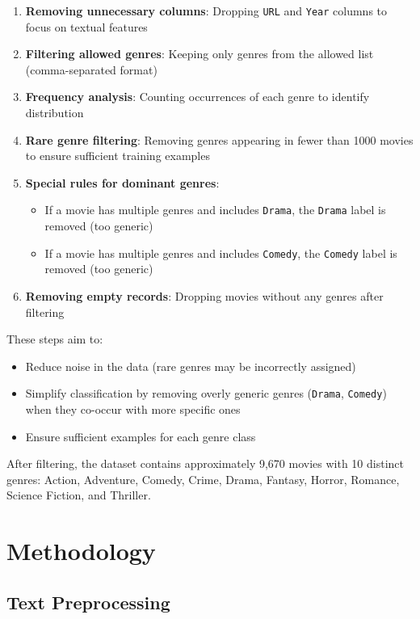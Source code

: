 \documentclass[12pt,a4paper]{article}
\begin{document}
\begin{enumerate}
    \item \textbf{Removing unnecessary columns}: Dropping \texttt{URL} and \texttt{Year} columns to focus on textual features
    \item \textbf{Filtering allowed genres}: Keeping only genres from the allowed list (comma-separated format)
    \item \textbf{Frequency analysis}: Counting occurrences of each genre to identify distribution
    \item \textbf{Rare genre filtering}: Removing genres appearing in fewer than 1000 movies to ensure sufficient training examples
    \item \textbf{Special rules for dominant genres}:
    \begin{itemize}
        \item If a movie has multiple genres and includes \texttt{Drama}, the \texttt{Drama} label is removed (too generic)
        \item If a movie has multiple genres and includes \texttt{Comedy}, the \texttt{Comedy} label is removed (too generic)
    \end{itemize}
    \item \textbf{Removing empty records}: Dropping movies without any genres after filtering
\end{enumerate}

These steps aim to:
\begin{itemize}
    \item Reduce noise in the data (rare genres may be incorrectly assigned)
    \item Simplify classification by removing overly generic genres (\texttt{Drama}, \texttt{Comedy}) when they co-occur with more specific ones
    \item Ensure sufficient examples for each genre class
\end{itemize}

After filtering, the dataset contains approximately 9,670 movies with 10 distinct genres: Action, Adventure, Comedy, Crime, Drama, Fantasy, Horror, Romance, Science Fiction, and Thriller.

\section{Methodology}

\subsection{Text Preprocessing}
\end{document}
